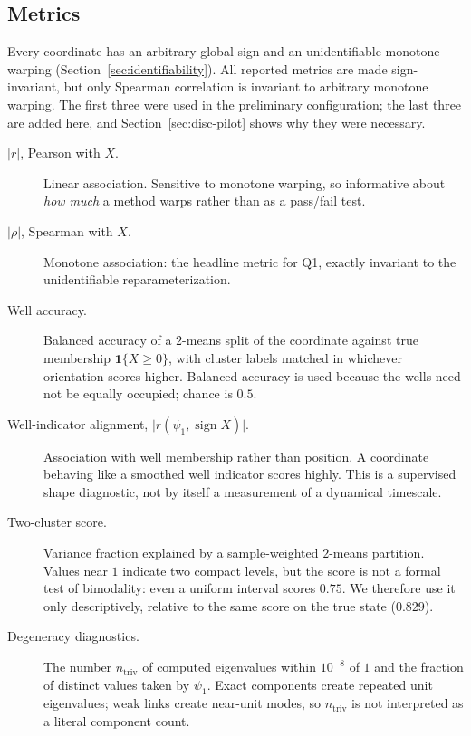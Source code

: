\documentclass[11pt]{article}
\newcommand{\sgn}{\operatorname{sign}}
\begin{document}
\subsection{Metrics}

Every coordinate has an arbitrary global sign and an unidentifiable monotone
warping (Section~\ref{sec:identifiability}). All reported metrics are made
sign-invariant, but only Spearman correlation is invariant to arbitrary monotone
warping. The first three were used in the preliminary configuration; the last three are
added here, and Section~\ref{sec:disc-pilot} shows why they were necessary.

\begin{description}
\item[$\lvert r\rvert$, Pearson with $X$.] Linear association. Sensitive to
monotone warping, so informative about \emph{how much} a method warps rather than
as a pass/fail test.

\item[$\lvert\rho\rvert$, Spearman with $X$.] Monotone association: the headline
metric for Q1, exactly invariant to the unidentifiable reparameterization.

\item[Well accuracy.] Balanced accuracy of a $2$-means split of the coordinate
against true membership $\mathbf{1}\{X\ge0\}$, with cluster labels matched in
whichever orientation scores higher. Balanced accuracy is used because the wells
need not be equally occupied; chance is $0.5$.

\item[Well-indicator alignment, $\lvert r(\psi_1,\sgn X)\rvert$.] Association
with well membership rather than position. A coordinate behaving like a smoothed
well indicator scores highly. This is a supervised shape diagnostic, not by
itself a measurement of a dynamical timescale.

\item[Two-cluster score.] Variance fraction explained by a sample-weighted
$2$-means partition. Values near $1$ indicate two compact
levels, but the score is not a formal test of bimodality: even a uniform interval
scores $0.75$. We therefore use it only descriptively, relative to the same score
on the true state ($0.829$).

\item[Degeneracy diagnostics.] The number $n_{\mathrm{triv}}$ of computed
eigenvalues within $10^{-8}$ of $1$ and the fraction of distinct values taken by
$\psi_1$. Exact components create repeated unit eigenvalues; weak links create
near-unit modes, so $n_{\mathrm{triv}}$ is not interpreted as a literal component
count.
\end{description}
\end{document}
